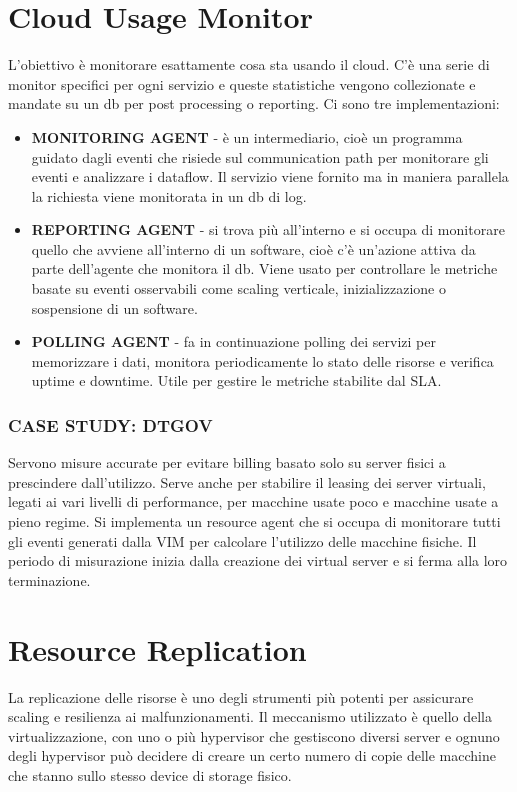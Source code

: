 \section{Cloud Usage Monitor}
L'obiettivo è monitorare esattamente cosa sta usando il cloud. C'è una serie di monitor specifici per ogni servizio e queste statistiche vengono collezionate e mandate su un db per post processing o reporting. Ci sono tre implementazioni:
\begin{itemize}
    \item \textbf{MONITORING AGENT} - è un intermediario, cioè un programma guidato dagli eventi che risiede sul communication path per monitorare gli eventi e analizzare i dataflow. Il servizio viene fornito ma in maniera parallela la richiesta viene monitorata in un db di log.
    \item \textbf{REPORTING AGENT} - si trova più all'interno e si occupa di monitorare quello che avviene all'interno di un software, cioè c'è un'azione attiva da parte dell'agente che monitora il db. Viene usato per controllare le metriche basate su eventi osservabili come scaling verticale, inizializzazione o sospensione di un software.
    \item \textbf{POLLING AGENT} - fa in continuazione polling dei servizi per memorizzare i dati, monitora periodicamente lo stato delle risorse e verifica uptime e downtime. Utile per gestire le metriche stabilite dal SLA.
\end{itemize}

\subsubsection{\textbf{CASE STUDY: DTGOV}}
Servono misure accurate per evitare billing basato solo su server fisici a prescindere dall'utilizzo. Serve anche per stabilire il leasing dei server virtuali, legati ai vari livelli di performance, per macchine usate poco e macchine usate a pieno regime. Si implementa un resource agent che si occupa di monitorare tutti gli eventi generati dalla VIM per calcolare l'utilizzo delle macchine fisiche. Il periodo di misurazione inizia dalla creazione dei virtual server e si ferma alla loro terminazione.

\section{Resource Replication}
La replicazione delle risorse è uno degli strumenti più potenti per assicurare scaling e resilienza ai malfunzionamenti. Il meccanismo utilizzato è quello della virtualizzazione, con uno o più hypervisor che gestiscono diversi server e ognuno degli hypervisor può decidere di creare un certo numero di copie delle macchine che stanno sullo stesso device di storage fisico.

